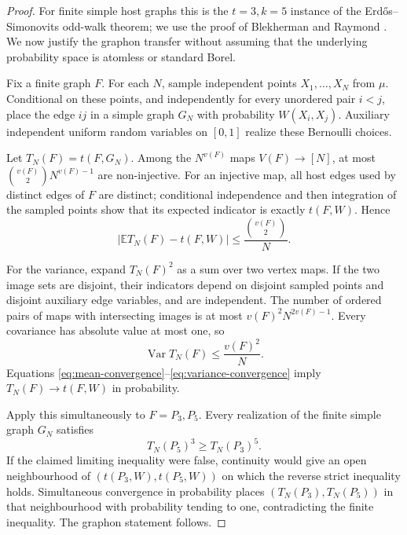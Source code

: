 \documentclass[11pt]{article}
\begin{document}
\begin{proof}
For finite simple host graphs this is the $t=3,k=5$ instance of the
Erd\H{o}s--Simonovits odd-walk theorem; we use the proof of Blekherman and
Raymond \cite{BlekhermanRaymond}.  We now justify the graphon transfer
without assuming that the underlying probability space is atomless or
standard Borel.

Fix a finite graph $F$.  For each $N$, sample independent points
$X_1,\ldots,X_N$ from $\mu$.  Conditional on these points, and independently
for every unordered pair $i<j$, place the edge $ij$ in a simple graph $G_N$
with probability $W(X_i,X_j)$.  Auxiliary independent uniform random
variables on $[0,1]$ realize these Bernoulli choices.

Let $T_N(F)=t(F,G_N)$.  Among the $N^{v(F)}$ maps
$V(F)\to[N]$, at most $\binom{v(F)}2N^{v(F)-1}$ are non-injective.  For an
injective map, all host edges used by distinct edges of $F$ are distinct;
conditional independence and then integration of the sampled points show
that its expected indicator is exactly $t(F,W)$.  Hence
\begin{equation}
 \left|\mathbb E T_N(F)-t(F,W)\right|
 \leq\frac{\binom{v(F)}2}{N}.
 \label{eq:mean-convergence}
\end{equation}

For the variance, expand $T_N(F)^2$ as a sum over two vertex maps.  If the
two image sets are disjoint, their indicators depend on disjoint sampled
points and disjoint auxiliary edge variables, and are independent.  The
number of ordered pairs of maps with intersecting images is at most
$v(F)^2N^{2v(F)-1}$.  Every covariance has absolute value at most one, so
\begin{equation}
 \operatorname{Var}T_N(F)\leq\frac{v(F)^2}{N}.
 \label{eq:variance-convergence}
\end{equation}
Equations \eqref{eq:mean-convergence}--\eqref{eq:variance-convergence} imply
$T_N(F)\to t(F,W)$ in probability.

Apply this simultaneously to $F=P_3,P_5$.  Every realization of the finite
simple graph $G_N$ satisfies
\[
 T_N(P_5)^3\geq T_N(P_3)^5.
\]
If the claimed limiting inequality were false, continuity would give an
open neighbourhood of $(t(P_3,W),t(P_5,W))$ on which the reverse strict
inequality holds.  Simultaneous convergence in probability places
$(T_N(P_3),T_N(P_5))$ in that neighbourhood with probability tending to
one, contradicting the finite inequality.  The graphon statement follows.
\end{proof}
\end{document}
